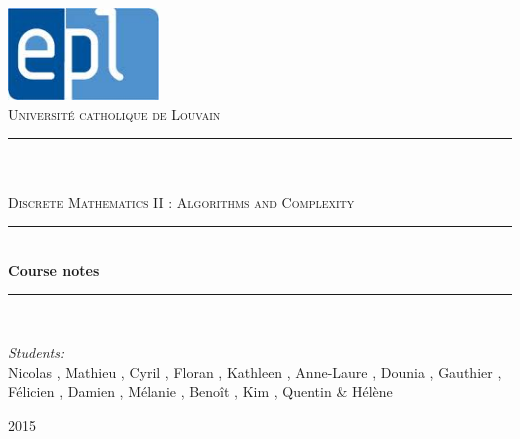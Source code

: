 \newcommand{\HRule}{\rule{\linewidth}{0.5mm}}

\begin{titlepage}
	
\begin{center}

\includegraphics[width=0.30\textwidth]{images/epl.jpg}\\[1cm]    

\textsc{\LARGE Universit\'e catholique de Louvain}\\[1.5cm]

\HRule \\[0.5cm]

\textsc{\Large {}}\\[0.2cm]
\textsc{\Large Discrete Mathematics II : Algorithms and Complexity}\\[0.5cm]


\HRule \\[2cm]
{\huge \bfseries Course notes}\\[1cm]

\HRule \\[1.5cm]

\begin{minipage}{0.8\textwidth}
\begin{flushleft} \large
\emph{Students:}\\
Nicolas , Mathieu , Cyril , Floran , Kathleen , Anne-Laure , Dounia , Gauthier , Félicien , Damien , M\'elanie , Beno\^it , Kim , Quentin   \& H\'el\`ene 
\end{flushleft}
\end{minipage}


\vfill

{\large  2015}

\end{center}	
	
	
\end{titlepage}
